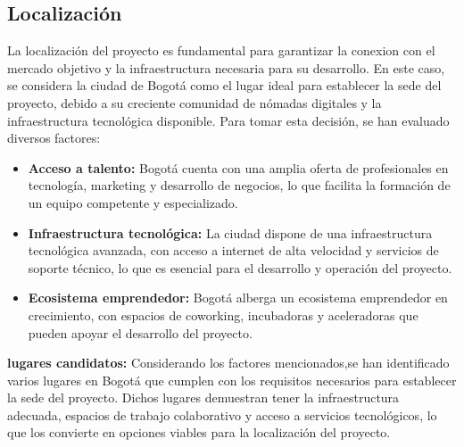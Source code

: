 \subsection*{Localización}
La localización del proyecto es fundamental para garantizar la conexion con el mercado objetivo y la infraestructura necesaria para su desarrollo. En este caso, se considera la ciudad de Bogotá como el lugar ideal para establecer la sede del proyecto, debido a su creciente comunidad de nómadas digitales y la infraestructura tecnológica disponible.
Para tomar esta decisión, se han evaluado diversos factores:
\begin{itemize}
    \item \textbf{Acceso a talento:} Bogotá cuenta con una amplia oferta de profesionales en tecnología, marketing y desarrollo de negocios, lo que facilita la formación de un equipo competente y especializado.
    \item \textbf{Infraestructura tecnológica:} La ciudad dispone de una infraestructura tecnológica avanzada, con acceso a internet de alta velocidad y servicios de soporte técnico, lo que es esencial para el desarrollo y operación del proyecto.
    \item \textbf{Ecosistema emprendedor:} Bogotá alberga un ecosistema emprendedor en crecimiento, con espacios de coworking, incubadoras y aceleradoras que pueden apoyar el desarrollo del proyecto.
\end{itemize}

\textbf{lugares candidatos:} Considerando los factores mencionados,se han identificado varios lugares en Bogotá que cumplen con los requisitos necesarios para establecer la sede del proyecto. Dichos lugares demuestran tener la infraestructura adecuada, espacios de trabajo colaborativo y acceso a servicios tecnológicos, lo que los convierte en opciones viables para la localización del proyecto.

